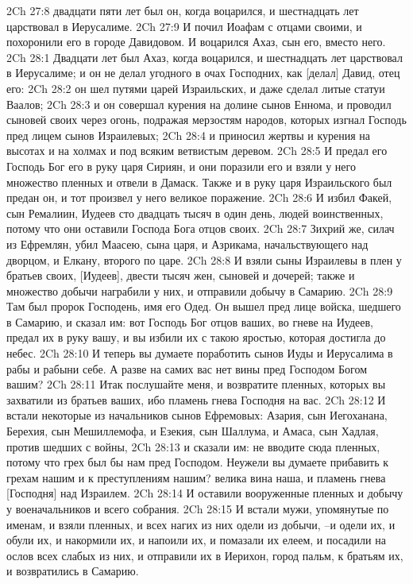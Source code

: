 2Ch 27:8  двадцати пяти лет был он, когда воцарился, и шестнадцать лет царствовал в Иерусалиме.
2Ch 27:9  И почил Иоафам с отцами своими, и похоронили его в городе Давидовом. И воцарился Ахаз, сын его, вместо него.
2Ch 28:1  Двадцати лет был Ахаз, когда воцарился, и шестнадцать лет царствовал в Иерусалиме; и он не делал угодного в очах Господних, как [делал] Давид, отец его:
2Ch 28:2  он шел путями царей Израильских, и даже сделал литые статуи Ваалов;
2Ch 28:3  и он совершал курения на долине сынов Еннома, и проводил сыновей своих через огонь, подражая мерзостям народов, которых изгнал Господь пред лицем сынов Израилевых;
2Ch 28:4  и приносил жертвы и курения на высотах и на холмах и под всяким ветвистым деревом.
2Ch 28:5  И предал его Господь Бог его в руку царя Сириян, и они поразили его и взяли у него множество пленных и отвели в Дамаск. Также и в руку царя Израильского был предан он, и тот произвел у него великое поражение.
2Ch 28:6  И избил Факей, сын Ремалиин, Иудеев сто двадцать тысяч в один день, людей воинственных, потому что они оставили Господа Бога отцов своих.
2Ch 28:7  Зихрий же, силач из Ефремлян, убил Маасею, сына царя, и Азрикама, начальствующего над дворцом, и Елкану, второго по царе.
2Ch 28:8  И взяли сыны Израилевы в плен у братьев своих, [Иудеев], двести тысяч жен, сыновей и дочерей; также и множество добычи награбили у них, и отправили добычу в Самарию.
2Ch 28:9  Там был пророк Господень, имя его Одед. Он вышел пред лице войска, шедшего в Самарию, и сказал им: вот Господь Бог отцов ваших, во гневе на Иудеев, предал их в руку вашу, и вы избили их с такою яростью, которая достигла до небес.
2Ch 28:10  И теперь вы думаете поработить сынов Иуды и Иерусалима в рабы и рабыни себе. А разве на самих вас нет вины пред Господом Богом вашим?
2Ch 28:11  Итак послушайте меня, и возвратите пленных, которых вы захватили из братьев ваших, ибо пламень гнева Господня на вас.
2Ch 28:12  И встали некоторые из начальников сынов Ефремовых: Азария, сын Иегоханана, Берехия, сын Мешиллемофа, и Езекия, сын Шаллума, и Амаса, сын Хадлая, против шедших с войны,
2Ch 28:13  и сказали им: не вводите сюда пленных, потому что грех был бы нам пред Господом. Неужели вы думаете прибавить к грехам нашим и к преступлениям нашим? велика вина наша, и пламень гнева [Господня] над Израилем.
2Ch 28:14  И оставили вооруженные пленных и добычу у военачальников и всего собрания.
2Ch 28:15  И встали мужи, упомянутые по именам, и взяли пленных, и всех нагих из них одели из добычи, --и одели их, и обули их, и накормили их, и напоили их, и помазали их елеем, и посадили на ослов всех слабых из них, и отправили их в Иерихон, город пальм, к братьям их, и возвратились в Самарию.
